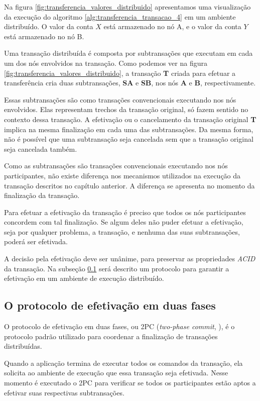 \documentclass[11pt,twoside,a4paper]{book}
\begin{document}
Na figura \ref{fig:transferencia_valores_distribuido} apresentamos uma visualização da execução do algoritmo \ref{alg:transferencia_transacao_4} em um ambiente distribuído. O valor da conta $X$ está armazenado no nó A, e o valor da conta $Y$ está armazenado no nó B.

Uma transação distribuída é composta por subtransações que executam em cada um dos nós envolvidos na transação. Como podemos ver na figura \ref{fig:transferencia_valores_distribuido}, a transação \textbf{T} criada para efetuar a transferência cria duas subtransações, \textbf{SA} e \textbf{SB}, nos nós \textbf{A} e \textbf{B}, respectivamente.

Essas subtransações são como transações convencionais executando nos nós envolvidos. Elas representam trechos da transação original, só fazem sentido no contexto dessa transação. A efetivação ou o cancelamento da transação original \textbf{T} implica na mesma finalização em cada uma das subtransações. Da mesma forma, não é possível que uma subtransação seja cancelada sem que a transação original seja cancelada também.

Como as subtransações são transações convencionais executando nos nós participantes, não existe diferença nos mecanismos utilizados na execução da transação descritos no capítulo anterior. A diferença se apresenta no momento da finalização da transação.

Para efetuar a efetivação da transação é preciso que todos os nós participantes concordem com tal finalização. Se algum deles não puder efetuar a efetivação, seja por qualquer problema, a transação, e nenhuma das suas subtransações, poderá ser efetivada. 

A decisão pela efetivação deve ser unânime, para preservar as propriedades \emph{ACID} da transação. Na subseção \ref{subsec:2pc} será descrito um protocolo para garantir a efetivação em um ambiente de execução distribuído.

\subsection{O protocolo de efetivação em duas fases}
\label{subsec:2pc}
O protocolo de efetivação em duas fases, ou 2PC (\emph{two-phase commit}, \cite{2pc}), é o protocolo padrão utilizado para coordenar a finalização de transações distribuídas.

Quando a aplicação termina de executar todos os comandos da transação, ela solicita ao ambiente de execução que essa transação seja efetivada. Nesse momento é executado o 2PC para verificar se todos os participantes estão aptos a efetivar suas respectivas subtransações.
\end{document}
